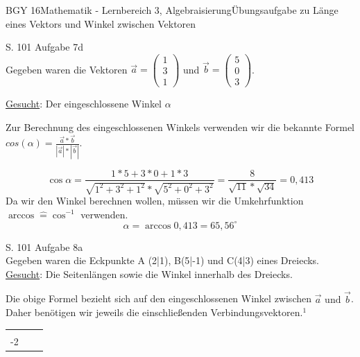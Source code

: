 \documentclass[oneside,openany,headings=optiontotoc,11pt,numbers=noenddot]{scrreprt}
\begin{document}
	\begin{worksheet}{BGY 16}{Mathematik - Lernbereich 3, Algebraisierung}{Übungsaufgabe zu Länge eines Vektors und Winkel zwischen Vektoren}
		
		\begin{framed}
			\noindent
			\tiny{\color{codegray}S. 101 Aufgabe 7d}\\
			\normalsize
			\noindent
			Gegeben waren die Vektoren \(\vec{a} = \left(\begin{array}{c}1\\3\\1\end{array}\right)\) und \(\vec{b} = \left(\begin{array}{c}5\\0\\3\end{array}\right)\).\par\bigskip\noindent
			\underline{Gesucht}: Der eingeschlossene Winkel \(\alpha\)\\
			\par\noindent
			Zur Berechnung des eingeschlossenen Winkels verwenden wir die bekannte Formel \(cos{(\alpha)} = \frac{\vec{a}*\vec{b}}{|\vec{a}|*|\vec{b}|}\).\\\noindent
			\par\noindent
			\[\cos{\alpha} = \frac{1*5 + 3*0 + 1*3}{\sqrt{1^2+3^2+1^2}*\sqrt{5^2+0^2+3^2}} = \frac{8}{\sqrt{11}*\sqrt{34}} = 0,413 \]
			Da wir den Winkel berechnen wollen, müssen wir die Umkehrfunktion \(\arccos \widehat{=} \cos^{-1}\) verwenden.\\
			\[\alpha = \arccos{0,413} = 65,56^{\circ}\]
			\par\bigskip\noindent
			\tiny{\color{codegray}S. 101 Aufgabe 8a}\\
			\normalsize
			\noindent
			Gegeben waren die Eckpunkte A (2|1), B(5|-1) und C(4|3) eines Dreiecks.\\
			\underline{Gesucht}: Die Seitenlängen sowie die Winkel innerhalb des Dreiecks.
			\par\bigskip\noindent
			Die obige Formel bezieht sich auf den eingeschlossenen Winkel zwischen \(\vec{a} \text{ und } \vec{b}\). Daher benötigen wir jeweils die einschließenden Verbindungsvektoren.\(^{1}\)\par\bigskip\noindent
			\begin{tabularx}{\textwidth}{XXX}
				\(\vec{AB} = \left(\begin{array}{c}3\\ -2\end{array}\right)\) &

\end{tabularx}
\end{framed}
\end{worksheet}
\end{document}
